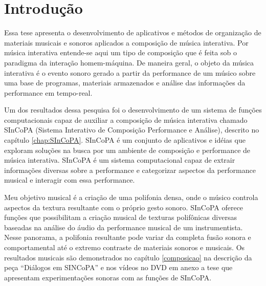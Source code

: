 \documentclass{ppgmus}
\begin{document}
\tableofcontents
{}

\listoffigures

\mainmatter




\chapter{Introdução}
\label{sec:intro}


Essa tese apresenta o desenvolvimento de aplicativos e métodos
de organização de materiais musicais e sonoros aplicados a composição
de música interativa. Por música interativa entende-se aqui um tipo
de composição que é feita sob o paradigma da interação homem-máquina.
De maneira geral, o objeto da música interativa é o evento sonoro gerado a partir da
performance de um músico sobre uma base de programas, materiais
armazenados e análise das informações da performance em tempo-real.


 Um dos resultados dessa pesquisa foi o desenvolvimento de um sistema de funções computacionais capaz
de auxiliar a composição de música interativa chamado SInCoPA (Sistema Interativo
de Composição Performance e Análise), descrito no capítulo \ref{chap:SInCoPA}.
 SInCoPA é um conjunto de aplicativos e idéias que exploram soluções
na busca por um ambiente de composição e
performance de música interativa. SInCoPA
 é um sistema computacional capaz de extrair informações diversas sobre a performance e
categorizar aspectos da performance musical e interagir com essa performance.


Meu objetivo musical é a criação de uma polifonia densa, onde o músico controla
aspectos da textura resultante com o próprio gesto sonoro. 
SInCoPA oferece funções que possibilitam a criação musical de texturas polifônicas
diversas baseadas na análise do áudio da performance musical de um instrumentista.
Nesse panorama, a
polifonia resultante pode variar da completa fusão sonora e comportamental até o extremo
contraste de materiais sonoros e musicais. Os resultados musicais são demonstrados no
capítulo \ref{composicao} na descrição da peça ``Diálogos em SINCoPA'' e nos vídeos no
DVD em anexo a tese que apresentam experimentações sonoras com as funções de SInCoPA.
\end{document}
